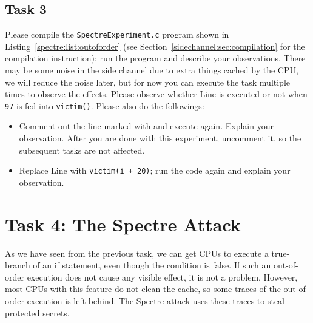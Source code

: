 \subsection{Task 3} 


Please compile the \texttt{SpectreExperiment.c} program 
shown in Listing~\ref{spectre:list:outoforder} (see Section~\ref{sidechannel:sec:compilation}
for the compilation instruction); 
run the program and describe your observations. 
There may be some noise in the side channel due to extra things cached by the
CPU, we will reduce the noise later, but for now you can execute the task multiple times to
observe the effects. Please observe whether Line  is executed 
or not when \texttt{97} is fed into \texttt{victim()}.  
Please also do the followings:

\begin{itemize}
\item Comment out the line marked with  and execute again. Explain your
observation. After you are done with this experiment, 
uncomment it, so the subsequent tasks are not affected.

\item Replace Line  with \texttt{victim(i + 20)}; run the code again and
explain your observation. 
\end{itemize}
 



\section{Task 4: The Spectre Attack}


As we have seen from the previous task, we can get CPUs to execute a true-branch of an
if statement, even though the condition is false. If such an out-of-order execution does not
cause any visible effect, it is not a problem. However, most CPUs with this feature do not
clean the cache, so some traces of the out-of-order execution is left behind. The 
Spectre attack uses these traces to steal protected secrets. 


